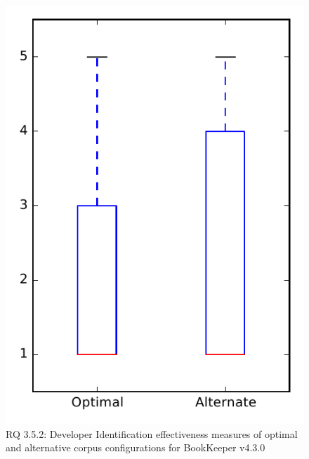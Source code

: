 
\begin{figure}
\centering
\includegraphics[height=0.4\textheight]{figures/combo/dit_rq2_bookkeeper}
\caption{RQ 3.5.2: Developer Identification effectiveness measures of optimal and alternative corpus configurations for BookKeeper v4.3.0}
\label{fig:combo:dit:rq2:bookkeeper}
\end{figure}
